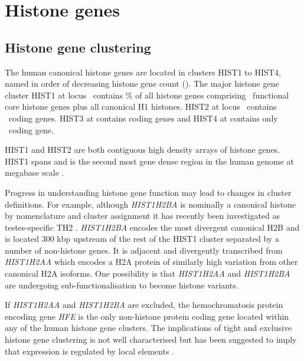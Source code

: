 \section{Histone genes}

\subsection{Histone gene clustering}
	The human canonical histone genes are located in clusters HIST1 to HIST4, 
	named in order of decreasing histone gene count ().
	The major histone gene cluster HIST1 at locus~\HISTOneLocus{}  
	contains \% of all histone genes 
	comprising \CodingGenesInHISTOne{}~functional core histone genes plus all canonical H1 histones. 
	HIST2 at locus~\HISTTwoLocus{} contains \CodingGenesInHISTTwo{}~coding genes. 
	HIST3 at \HISTThreeLocus{} contains \CodingGenesInHISTThree{} coding genes 
	and HIST4 at \HISTFourLocus{} contains only \CodingGenesInHISTFour{}~coding gene. 

	HIST1 and HIST2 are both contiguous high density arrays of histone genes. 
	HIST1 spans \HISTOneSpan{} 
	and is the second most gene dense region in the human genome at megabase scale \citep{MHC-III-analysis}.

	Progress in understanding histone gene function may lead to changes in cluster definitions. 
	For example, although \textit{HIST1H2BA} is nominally a canonical histone 
	by nomenclature and cluster assignment
	it has recently been investigated as testes-specific TH2 \citep{Urahama2014}.
	\textit{HIST1H2BA} encodes the most divergent canonical H2B 
	and is located 300 kbp upstream of the rest of the HIST1 cluster 
	separated by a number of non-histone genes. 
	It is adjacent and divergently transcribed from \textit{HIST1H2AA} 
	which encodes a H2A protein of similarly high variation from other canonical H2A isoforms. 
	One possibility is that \textit{HIST1H2AA} and \textit{HIST1H2BA} 
	are undergoing sub-functionalisation to become histone variants.

	If \textit{HIST1H2AA} and \textit{HIST1H2BA} are excluded, 
	the hemochromatosis protein encoding gene \textit{HFE} \citep{AlbigDoenecke1998} 
	is the only non-histone protein coding gene located within any of the human histone gene clusters. 
	The implications of tight and exclusive histone gene clustering 
	is not well characterised \citep{Eirinlopez2009}
	but has been suggested to imply that expression is regulated by local elements \citep{close-regulators}.

